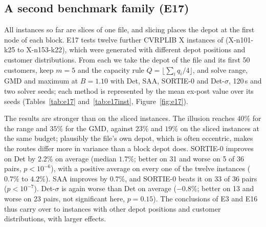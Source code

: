 \documentclass[11pt]{article}
\theoremstyle{definition}
\begin{document}
\begin{table}[t]\centering\small
\caption{E16: risk-adjusted deterministic (Det-$\sigma$) and normal-marginal
(PBOI-N) objectives, E3 grid, $B=1.10$ (format as Table~\ref{tab:e3}; the
variance is omitted for PBOI-N because the expected empirical variance does
not depend on the marginal family).}\label{tab:e16}

\end{table}

\subsection{A second benchmark family (E17)}\label{sec:e17}
All instances so far are slices of one file, and slicing places the depot at
the first node of each block. E17 tests twelve further CVRPLIB X instances of
\citet{uchoa2017new} (X-n101-k25 to X-n153-k22), which were generated with
different depot positions and customer distributions. From each we take the depot of the file and its
first 50 customers, keep $m=5$ and the capacity rule $Q=\lfloor\sum_iq_i/4\rfloor$,
and solve range, GMD and maximum at $B=1.10$ with Det, SAA, SORTIE-0 and
Det-$\sigma$, 120\,s and two solver seeds; each method is represented by the
mean ex-post value over its seeds (Tables~\ref{tab:e17}
and~\ref{tab:e17inst}, Figure~\ref{fig:e17}).

The results are stronger than on the sliced instances. The illusion reaches
$40\%$ for the range and $35\%$ for the GMD, against $23\%$ and $19\%$ on the
sliced instances at the same budget; plausibly the file's own depot, which is often eccentric,
makes the routes differ more in variance than a block depot does. SORTIE-0 improves on Det by $2.2\%$ on average
(median $1.7\%$; better on 31 and worse on 5 of 36 pairs, $p<10^{-6}$), with a
positive average on every one of the twelve instances ($0.7\%$ to $4.2\%$).
SAA improves by $0.7\%$, and SORTIE-0 beats it on 33 of 36 pairs
($p<10^{-7}$). Det-$\sigma$ is again worse than Det on average ($-0.8\%$; better on 13 and
worse on 23 pairs, not significant here, $p=0.15$). The
conclusions of E3 and E16 thus carry over to instances with other depot
positions and customer distributions, with larger effects.

\begin{table}[t]\centering\small
\caption{E17: second benchmark family (12 X instances, depot plus first 50
customers), $B=1.10$, 120\,s, mean of two solver seeds; improvement of the
ex-post value over Det (format as Table~\ref{tab:e3}).}\label{tab:e17}

\end{table}
\end{document}
